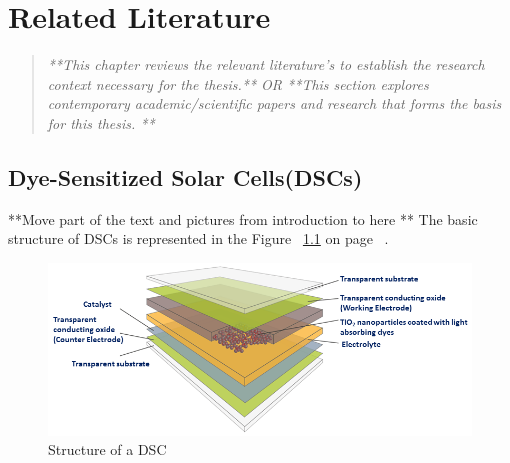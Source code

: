 \chapter{Related Literature}
\begin{quote} 
\textit{ **This chapter reviews the relevant literature's to establish the research context necessary for the thesis.** OR **This section explores contemporary academic/scientific papers and research that forms the basis for this thesis. ** } 
\end{quote}


  
\section{Dye-Sensitized Solar Cells(DSCs)}

**Move part of the text and pictures from introduction to here **
The basic structure of \ac{DSCs} is represented in the Figure ~\ref{fig:DSC_struc} on page ~\pageref{fig:DSC_struc}. 

\begin{figure}[H]
\begin{center}
\includegraphics[width=\textwidth]{images/DSCs_struc}
\caption{Structure of a DSC }
\label{fig:DSC_struc}
\end{center}
\end{figure}

